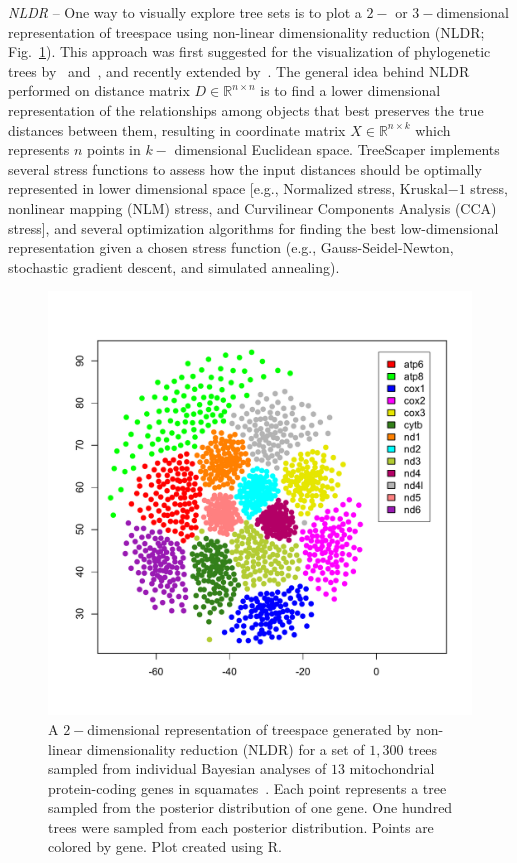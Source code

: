 \documentclass[11pt]{article}
\begin{document}
{\it NLDR} -- One way to visually explore tree sets is to plot a $2-$ or $3-$dimensional representation of treespace using non-linear dimensionality reduction (NLDR; Fig.~\ref{fig1}). This approach was first suggested for the visualization of phylogenetic trees by~\citealp{AK:2002} and~\citealp{HHJA:2005}, and recently extended by~\citealp{WHG:2017}. The general idea behind NLDR performed on distance matrix $D\in \mathbb{R}^{n\times n}$ is to find a lower dimensional representation of the relationships among objects that best preserves the true distances between them, resulting in coordinate matrix $X\in \mathbb{R}^{n\times k}$ which represents $n$ points in $k-$ dimensional Euclidean space. TreeScaper implements several stress functions to assess how the input distances should be optimally represented in lower dimensional space [e.g., Normalized stress, Kruskal$-1$ stress, nonlinear mapping (NLM) stress, and Curvilinear Components Analysis (CCA) stress], and several optimization algorithms for finding the best low-dimensional representation given a chosen stress function (e.g., Gauss-Seidel-Newton, stochastic gradient descent, and simulated annealing). \\


\begin{figure}[thbp!]\centering
\includegraphics[scale=0.5]{imagesForManual/Figure1.pdf}
\caption{A $2-$dimensional representation of treespace generated by non-linear dimensionality reduction (NLDR) for a set of $1,300$ trees sampled from individual Bayesian analyses of $13$ mitochondrial protein-coding genes in squamates~\citep{CdKKGNNJPP:2009}. Each point represents a tree sampled from the posterior distribution of one gene. One hundred trees were sampled from each posterior distribution. Points are colored by gene. Plot created using R.}\label{fig1}
\end{figure}
\end{document}

